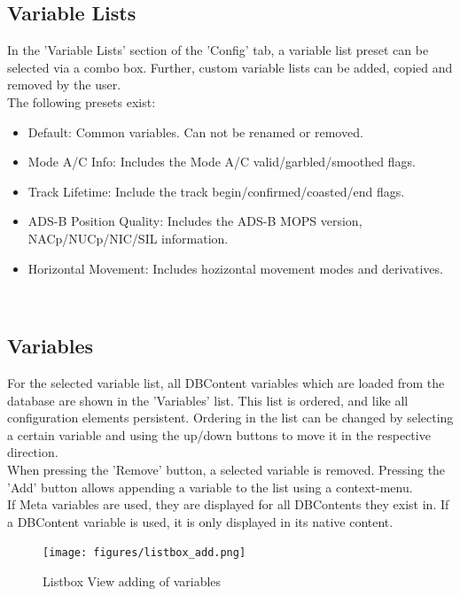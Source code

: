 \subsection{Variable Lists}

In the 'Variable Lists' section of the 'Config' tab, a variable list preset can be selected via a combo box. 
Further, custom variable lists can be added, copied and removed by the user. \\

The following presets exist:

\begin{itemize}
\item Default: Common variables. Can not be renamed or removed.
\item Mode A/C Info: Includes the Mode A/C valid/garbled/smoothed flags.
\item Track Lifetime: Include the track begin/confirmed/coasted/end flags.
\item ADS-B Position Quality: Includes the ADS-B MOPS version, NACp/NUCp/NIC/SIL information.
\item Horizontal Movement: Includes hozizontal movement modes and derivatives.
\end{itemize}
\ \\

\subsection{Variables}

For the selected variable list, all DBContent variables which are loaded from the database are shown in the 'Variables' list. 
This list is ordered, and like all configuration elements persistent. 
Ordering in the list can be changed by selecting a certain variable and using the up/down buttons to move it in the respective direction. \\

When pressing the 'Remove' button, a selected variable is removed. Pressing the 'Add' button allows appending a variable to the list using a context-menu. \\

If Meta variables are used, they are displayed for all DBContents they exist in. If a DBContent variable is used, it is only displayed in its native content.

\begin{figure}[H]
    \texttt{[image: figures/listbox\_add.png]}
  \caption{Listbox View adding of variables}
\end{figure}

